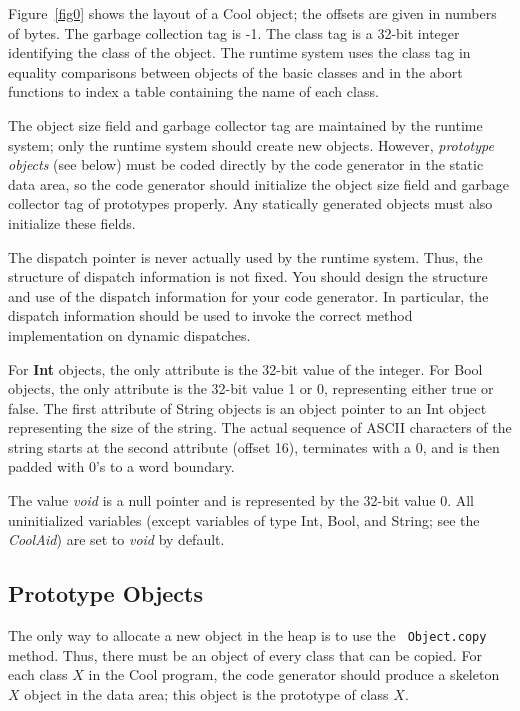 \documentclass[11pt]{article}
\def\U#1{{\sf{}#1}}
\def\C#1{{\bf{}#1}}
\begin{document}
Figure~\ref{fig0} shows the layout of a Cool object; the offsets are
given in numbers of bytes.  The garbage collection tag is -1.  The
class tag is a 32-bit integer identifying the class of the object. The
runtime system uses the class tag in equality comparisons between
objects of the basic classes and in the abort functions to index a
table containing the name of each class.

The object size field and garbage collector tag are maintained by the
runtime system; only the runtime system should create new objects.
However, {\em prototype objects} (see below) must be coded directly by
the code generator in the static data area, so the code generator
should initialize the object size field and garbage collector tag of
prototypes properly.  Any statically generated objects must also
initialize these fields.

The dispatch pointer is never actually used by the runtime system.
Thus, the structure of dispatch information is not fixed.  You should
design the structure and use of the dispatch information for your code
generator. In particular, the dispatch information should be used to
invoke the correct method implementation on dynamic dispatches.

For \C{Int} objects, the only attribute is the 32-bit value of the
integer. For \U{Bool} objects, the only attribute is the 32-bit value
1 or 0, representing either true or false.  The first attribute of
\U{String} objects is an object pointer to an \U{Int} object
representing the size of the string. The actual sequence of ASCII
characters of the string starts at the second attribute (offset 16),
terminates with a 0, and is then padded with 0's to a word boundary.

The value {\em void} is a null pointer and is represented by the
32-bit value 0.  All uninitialized variables (except variables of type
\U{Int}, \U{Bool}, and \U{String}; see the {\em CoolAid}) are set to
{\em void} by default.

\subsection{Prototype Objects}

The only way to allocate a new object in the heap is to use the {\tt
Object.copy} method.  Thus, there must be an object of every class
that can be copied.  For each class $X$ in the Cool program, the code
generator should produce a skeleton $X$ object in the data area; this
object is the prototype of class $X$.
\end{document}
